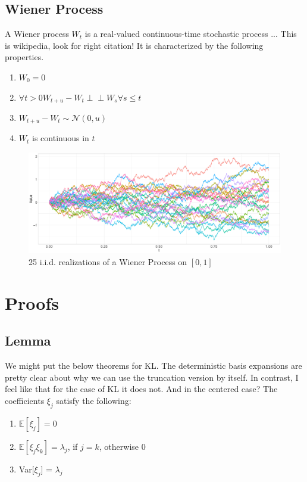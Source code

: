 \documentclass[11pt,twoside,a4paper]{article}
\begin{document}
\subsection{Wiener Process}\label{Wiener}
A Wiener process $W_t$ is a real-valued continuous-time stochastic process {\color{red} ... This is wikipedia, look for right citation!}
It is characterized by the following properties.

\begin{multicols}{2}
	\begin{enumerate}
		\item $W_0 = 0$
		\item $\forall t > 0 W_{t+u} - W_t \perp\!\!\!\perp W_s \forall s \leq t$
		\item $W_{t+u} - W_t \sim \mathcal{N}(0,u)$
		\item $W_t$ is continuous in $t$
	\end{enumerate}
\end{multicols}

\begin{figure}[H]\label{Wiener_plot}
	\includegraphics[width = \textwidth]{../Graphics/Wiener_plot.pdf}
	\caption{25 i.i.d. realizations of a Wiener Process on $[0,1]$}
\end{figure}

	\section{Proofs}
	\subsection{Lemma} \label{Proof1}
	{\color{orange} We might put the below theorems for KL. The deterministic basis expansions are pretty clear about why we can use the truncation version by itself. In contrast, I feel like that for the case of KL it does not. And in the centered case?} 
	The coefficients $\xi_{j}$ satisfy the following:
	\begin{enumerate}
		\item $\mathbb{E}[\xi_{j}] = 0$
		\item $\mathbb{E}[\xi_{j} \xi_{k}] = \lambda_{j}$, if $j = k$, otherwise 0
		\item Var[$\xi_{j}$] = $\lambda_{j}$
	\end{enumerate}
	
\end{document}
